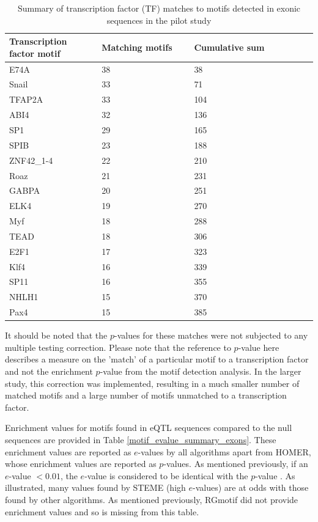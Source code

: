 \documentclass[12pt]{article}
\begin{document}
\begin{table}[!ht]
\centering
\caption{Summary of transcription factor (TF) matches to motifs detected in exonic sequences in the pilot study}\label{fig: motif_tf_summary_exons}
\begin{tabular}{p{0.3\linewidth}p{0.3\linewidth}p{0.3\linewidth}p{0.4\linewidth}}
\toprule[0.2em]
Transcription factor motif & Matching motifs & Cumulative sum\\ 
\midrule[0.1em]
E74A & 38 & 38 \\
Snail & 33 & 71\\
TFAP2A & 33 & 104\\
ABI4 & 32 & 136\\
SP1 & 29 & 165\\
SPIB & 23 & 188\\
ZNF42{\_}1-4 & 22 & 210\\
Roaz & 21 & 231\\
GABPA & 20 & 251\\
ELK4 & 19 & 270\\
Myf & 18 & 288\\
TEAD & 18 & 306\\
E2F1 & 17 & 323\\
Klf4 & 16 & 339\\
SP11 & 16 & 355\\
NHLH1 & 15 & 370\\
Pax4 & 15 & 385\\
\bottomrule[0.2em]
\end{tabular}
\end{table} 
\newpage
It should be noted that the $p$-values for these matches were not subjected to any multiple testing correction. Please note that the reference to $p$-value here describes a measure on the 'match' of a particular motif to a transcription factor and not the enrichment $p$-value from the motif detection analysis.
In the larger study, this correction was implemented, resulting in a much smaller number of matched motifs and a large number of motifs unmatched to a transcription factor.

Enrichment values for motifs found in eQTL sequences compared to the null sequences are provided in Table \ref{motif_evalue_summary_exons}. These enrichment values are reported as $e$-values by all algorithms apart from HOMER, whose enrichment values are reported as $p$-values. As mentioned previously, if an $e$-value $< 0.01$, the $e$-value is considered to be identical with the $p$-value \citep{NCBI2006}. As illustrated, many values found by STEME (high $e$-values) are at odds with those found by other algorithms. As mentioned previously, RGmotif did not provide enrichment values and so is missing from this table. 
\end{document}
